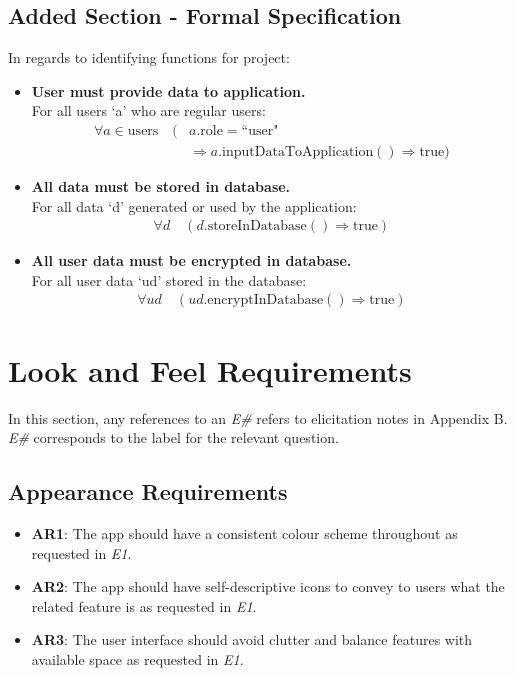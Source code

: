 \documentclass[12pt]{article}
\begin{document}
\subsection{Added Section - Formal Specification}
In regards to identifying functions for project:
\begin{itemize}
    \item \textbf{User must provide data to application.}\\
    For all users `a' who are regular users:
    \[
    \begin{split}
        \forall a \in \text{users} \quad (& a.\text{role} = \text{``user"}\\
        & \Rightarrow a.\text{inputDataToApplication}() \Rightarrow \text{true})
    \end{split}
    \]

    \item \textbf{All data must be stored in database.}\\
    For all data `d' generated or used by the application:
    \[
    \begin{split}
        \forall d \quad (d.\text{storeInDatabase}() \Rightarrow \text{true})
    \end{split}
    \]
    
    \item \textbf{All user data must be encrypted in database.}\\
    For all user data `ud' stored in the database:
    \[
    \begin{split}
        \forall ud \quad (ud.\text{encryptInDatabase}() \Rightarrow \text{true})
    \end{split}
    \]
    
\end{itemize}

\section{Look and Feel Requirements}
In this section, any references to an \textit{E\#} refers to elicitation notes in Appendix B. \textit{E\#} corresponds
to the label for the relevant question.

\subsection{Appearance Requirements}
\begin{itemize}
  \item \textbf{AR1}: The app should have a consistent colour scheme throughout as requested in \textit{E1}.
  \item \textbf{AR2}: The app should have self-descriptive icons to convey to users what the related feature is as requested in \textit{E1}.
  \item \textbf{AR3}: The user interface should avoid clutter and balance features with available space as requested in \textit{E1}.
\end{itemize}
\end{document}
